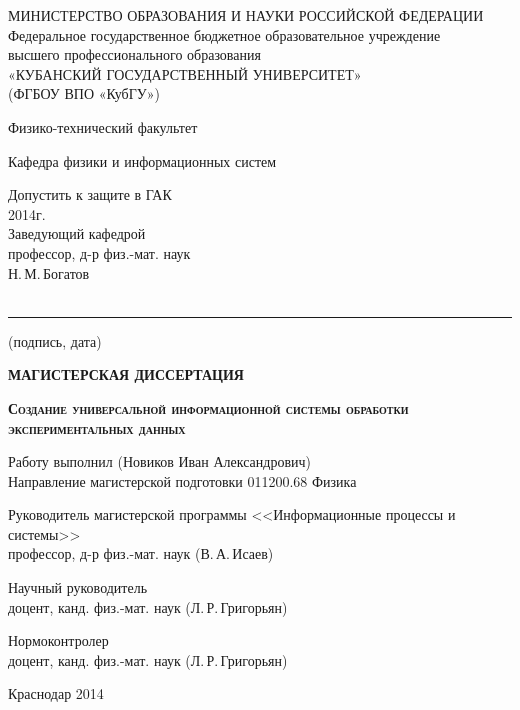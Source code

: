 \documentclass[a4paper, 14pt, titlepage]{extarticle}
\author{\theauthor, кафедра физики и информационных систем КубГУ}
\title{\thetitle}
\newcommand{\thetitle}{Создание универсальной информационной системы обработки экспериментальных данных}
\begin{document}

  \thispagestyle{empty}
  \begin {center}
  \small{МИНИСТЕРСТВО ОБРАЗОВАНИЯ И НАУКИ РОССИЙСКОЙ ФЕДЕРАЦИИ}\\
  Федеральное государственное бюджетное образовательное учреждение\\
  высшего профессионального образования\\
  «КУБАНСКИЙ ГОСУДАРСТВЕННЫЙ УНИВЕРСИТЕТ»\\
  (ФГБОУ ВПО «КубГУ»)

  Физико-технический факультет

  \vspace {1cm}

  Кафедра физики и информационных систем

  \vspace {1cm}

  \hfill
  \begin{minipage}{7cm}
    \begin{flushleft}
      Допустить к защите в ГАК\\
      \hspace*{0mm}\hrulefill{} 2014г.\\
      Заведующий кафедрой\\
      профессор, д-р физ.-мат. наук\\
      Н.\,М.\,Богатов \hrulefill{}\\
      ~\hrule
      \footnotesize{\centering (подпись, дата)\par}
    \end{flushleft}
  \end{minipage}

  \vspace {1.5cm}

  \textbf{МАГИСТЕРСКАЯ ДИССЕРТАЦИЯ}

  \vspace {0.5cm}

  \textbf{ \large \scshape \thetitle }

  \vspace {1.5cm}

  \begin{flushleft}
    Работу выполнил \hrulefill{}  (Новиков Иван Александрович)\\
    Направление магистерской подготовки 011200.68 Физика

    Руководитель магистерской программы <<Информационные процессы и системы>>\\
    профессор, д-р физ.-мат. наук \hrulefill{} (В.\,А.\,Исаев)

    Научный руководитель\\
    доцент, канд. физ.-мат. наук \hrulefill{} (Л.\,Р.\,Григорьян)

    Нормоконтролер\\
    доцент, канд. физ.-мат. наук \hrulefill{} (Л.\,Р.\,Григорьян)
  \end{flushleft}

  \vfill

  Краснодар 2014
  \end {center}
\end{document}
